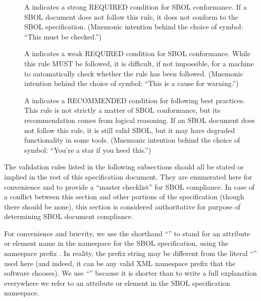 \begin{description}

\item[\hspace*{6.5pt}\vSymbol\vsp] A \vSymbolName indicates a strong
  REQUIRED condition for SBOL conformance. If a SBOL document does not follow this rule, it does not conform to the SBOL
  specification.  (Mnemonic intention behind the choice of symbol:
  ``This must be checked.'')

\item[\hspace*{6.5pt}\cSymbol\csp] A \cSymbolName indicates a weak
  REQUIRED condition for SBOL conformance. While this rule MUST be followed, it is difficult, if not  impossible, for a machine to automatically check whether the rule has been followed. (Mnemonic intention behind the choice of symbol: ``This is a cause for warning.'')

\item[\hspace*{6.5pt}\mSymbol\msp] A \mSymbolName indicates a 
  RECOMMENDED condition for following best practices.  This rule is not strictly a matter of SBOL conformance, but its recommendation comes from logical
  reasoning.  If an SBOL document does not follow this rule, it is still valid SBOL, but it may have degraded functionality in some tools.  (Mnemonic intention behind the choice of symbol: ``You're a star if you heed this.'')

\end{description}

The validation rules listed in the following subsections should all be
stated or implied in the rest of this specification document.  They
are enumerated here for convenience and to provide a ``master
checklist'' for SBOL compliance.  In case of a conflict between this
section and other portions of the specification (though there should
be none), this section is considered authoritative for purpose of
determining SBOL document compliance.

For \notice convenience and brievity, we use the shorthand
``'' to stand for an attribute or element name 
in the namespace for the SBOL specification, using
the namespace prefix .  In reality, the prefix string may be different from the literal ``'' used here (and indeed, it can be any valid XML namespace prefix that the software
chooses).  We use ``'' because it is shorter than to
write a full explanation everywhere we refer to an attribute or element
in the SBOL specification namespace.

